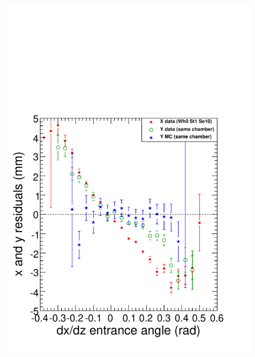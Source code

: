 \documentclass[compress]{beamer}
\begin{document}
\begin{frame}
\begin{columns}
\includegraphics[width=\linewidth]{evenstranger_sawtooth.pdf}
\end{columns}
\end{frame}
\end{document}
